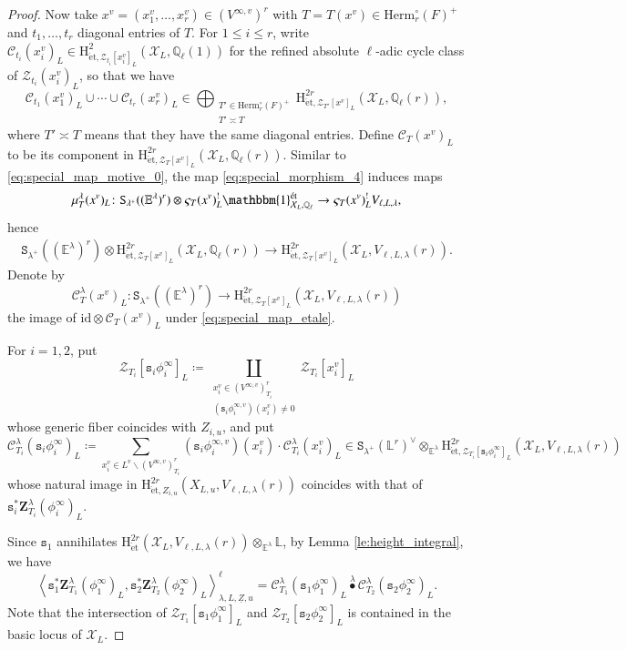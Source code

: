 \documentclass[12pt]{amsart}
\numberwithin{equation}{section}
\theoremstyle{plain}
\theoremstyle{definition}
\theoremstyle{remark}
\renewcommand{\c}[1]{\mathcal{#1}}
\renewcommand{\d}[1]{\mathbb{#1}}
\renewcommand{\r}[1]{\mathrm{#1}}
\renewcommand{\(}{\left(}
\renewcommand{\)}{\right)}
\newcommand{\ul}{\underline}
\renewcommand{\leq}{\leqslant}
\newcommand{\cC}{\c C}
\newcommand{\cX}{\c X}
\newcommand{\cZ}{\c Z}
\newcommand{\dE}{\d E}
\newcommand{\dL}{\d L}
\newcommand{\dQ}{\d Q}
\newcommand{\rH}{\r H}
\newcommand{\tS}{\mathtt{S}}
\newcommand{\ts}{\mathtt{s}}
\newcommand{\bbZ}{\boldsymbol{Z}}
\newcommand{\llangle}{\left\langle}
\newcommand{\rrangle}{\right\rangle}
\newcommand{\et}{{\acute{\r{e}}\r{t}}}
\newcommand{\Herm}{\r{Herm}}
\newcommand{\id}{\r{id}}
\begin{document}
\begin{proof}
Now take $x^v=(x^v_1,\dots,x^v_r)\in(V^{\infty,v})^r$ with $T=T(x^v)\in\Herm_r^\circ(F)^+$ and $t_1,\dots,t_r$ diagonal entries of $T$. For $1\leq i\leq r$, write $\cC_{t_i}(x^v_i)_L\in\rH^2_{\et,\cZ_{t_i}[x^v_i]_L}(\cX_L,\dQ_\ell(1))$ for the refined absolute $\ell$-adic cycle class of $\cZ_{t_i}(x^v_i)_L$, so that we have
\[
\cC_{t_1}(x^v_1)_L\cup\cdots\cup\cC_{t_r}(x^v_r)_L\in
\bigoplus_{\substack{T'\in\Herm_r^\circ(F)^+ \\ T'\asymp T}}\rH^{2r}_{\et,\cZ_{T'}[x^v]_L}(\cX_L,\dQ_\ell(r)),
\]
where $T'\asymp T$ means that they have the same diagonal entries. Define $\cC_T(x^v)_L$ to be its component in $\rH^{2r}_{\et,\cZ_T[x^v]_L}(\cX_L,\dQ_\ell(r))$. Similar to \eqref{eq:special_map_motive_0}, the map \eqref{eq:special_morphism_4} induces maps
\begin{align*}
\mu^\lambda_T(x^v)_L\colon\tS_{\lambda^+}((\dE^\lambda)^r)\otimes\varsigma_T(x^v)_L^!\mathbbm{1}^\et_{\cX_L,\dQ_\ell}
\to\varsigma_T(x^v)_L^!V_{\ell,L,\lambda},
\end{align*}
hence
\begin{align}\label{eq:special_map_etale}
\tS_{\lambda^+}((\dE^\lambda)^r)\otimes\rH^{2r}_{\et,\cZ_T[x^v]_L}(\cX_L,\dQ_\ell(r))
\to\rH^{2r}_{\et,\cZ_T[x^v]_L}(\cX_L,V_{\ell,L,\lambda}(r)).
\end{align}
Denote by
\[
\cC^\lambda_T(x^v)_L\colon\tS_{\lambda^+}((\dE^\lambda)^r)\to\rH^{2r}_{\et,\cZ_T[x^v]_L}(\cX_L,V_{\ell,L,\lambda}(r))
\]
the image of $\id\otimes\cC_T(x^v)_L$ under \eqref{eq:special_map_etale}.

For $i=1,2$, put
\[
\cZ_{T_i}[\ts_i\phi^\infty_i]_L\coloneqq\coprod_{\substack{x^v_i\in (V^{\infty,v})^r_{T_i}\\ (\ts_i\phi^{\infty,v}_i)(x^v_i)\neq0}}
\cZ_{T_i}[x^v_i]_L
\]
whose generic fiber coincides with $Z_{i,u}$, and put
\[
\cC^\lambda_{T_i}(\ts_i\phi^\infty_i)_L\coloneqq
\sum_{x^v_i\in L^v\backslash (V^{\infty,v})^r_{T_i}}(\ts_i\phi^{\infty,v}_i)(x^v_i)\cdot \cC^\lambda_{T_i}(x^v_i)_L
\in\tS_{\lambda^+}(\dL^r)^\vee\otimes_{\dE^\lambda}\rH^{2r}_{\et,\cZ_{T_i}[\ts_i\phi^\infty_i]_L}(\cX_L,V_{\ell,L,\lambda}(r))
\]
whose natural image in $\rH^{2r}_{\et,Z_{i,u}}(X_{L,u},V_{\ell,L,\lambda}(r))$ coincides with that of $\ts_i^*\bbZ^\lambda_{T_i}(\phi^\infty_i)_L$.

Since $\ts_1$ annihilates $\rH^{2r}_{\et}(\cX_L,V_{\ell,L,\lambda}(r))\otimes_{\dE^\lambda}\dL$, by Lemma \ref{le:height_integral}, we have
\[
\llangle\ts_1^*\bbZ^\lambda_{T_1}(\phi^\infty_1)_L,\ts_2^*\bbZ^\lambda_{T_2}(\phi^\infty_2)_L\rrangle_{\lambda,L,\ul{Z},u}^\ell
=\cC^\lambda_{T_1}(\ts_1\phi^\infty_1)_L\overset{\lambda}\bullet\cC^\lambda_{T_2}(\ts_2\phi^\infty_2)_L.
\]
Note that the intersection of $\cZ_{T_1}[\ts_1\phi^\infty_1]_L$ and $\cZ_{T_2}[\ts_2\phi^\infty_2]_L$ is contained in the basic locus of $\cX_L$.


\end{proof}
\end{document}
